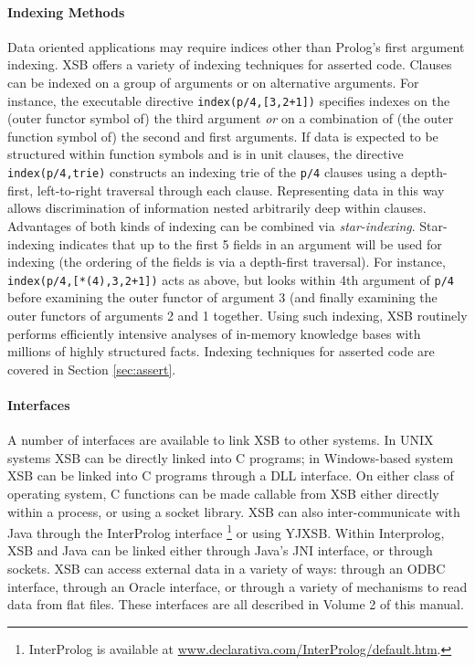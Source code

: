 \paragraph{Indexing Methods} Data oriented applications may
require indices other than Prolog's first argument indexing.  XSB
offers a variety of indexing techniques for asserted code.  Clauses
can be indexed on a group of arguments or on alternative arguments.
For instance, the executable directive {\tt index(p/4,[3,2+1])}
specifies indexes on the (outer functor symbol of) the third argument
{\em or} on a combination of (the outer function symbol of) the second
and first arguments.  If data is expected to be structured within
function symbols and is in unit clauses, the directive {\tt
  index(p/4,trie)} constructs an indexing trie of the {\tt p/4}
clauses using a depth-first, left-to-right traversal through each
clause.  Representing data in this way allows discrimination of
information nested arbitrarily deep within clauses.  Advantages of
both kinds of indexing can be combined via {\em star-indexing}.
Star-indexing indicates that up to the first 5 fields in an argument
will be used for indexing (the ordering of the fields is via a
depth-first traversal).  For instance, {\tt index(p/4,[*(4),3,2+1])}
acts as above, but looks within 4th argument of {\tt p/4} before
examining the outer functor of argument 3 (and finally examining the
outer functors of arguments 2 and 1 together.  Using such indexing, XSB
routinely performs efficiently intensive analyses of in-memory
knowledge bases with millions of highly structured facts.  Indexing
techniques for asserted code are covered in Section \ref{sec:assert}.

 
\paragraph{Interfaces} A number of interfaces are available to link XSB
to other systems.  In UNIX systems XSB can be directly linked into C
programs; in Windows-based system XSB can be linked into C programs
through a DLL interface.  On either class of operating system, C
functions can be made callable from XSB either directly within a
process, or using a socket library.  XSB can also inter-communicate
with Java through the InterProlog interface \footnote{InterProlog is 
available at \url{www.declarativa.com/InterProlog/default.htm}.} or
using YJXSB.  Within Interprolog, XSB and Java can be linked either through
Java's JNI interface, or through sockets.  XSB can access external
data in a variety of ways: through an ODBC interface, through an
Oracle interface, or through a variety of mechanisms to read data from
flat files.  These interfaces are all described in Volume 2 of this
manual.

